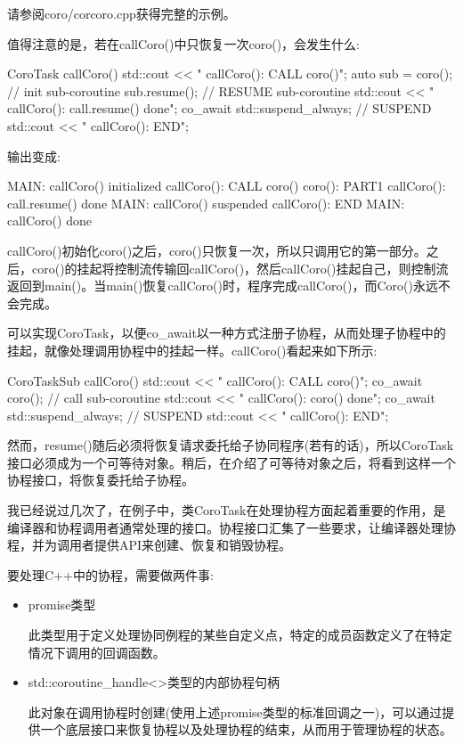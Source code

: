 请参阅coro/corcoro.cpp获得完整的示例。


值得注意的是，若在callCoro()中只恢复一次coro()，会发生什么:

\begin{cpp}
CoroTask callCoro()
{
	std::cout << " callCoro(): CALL coro()\n";
	auto sub = coro(); // init sub-coroutine
	sub.resume(); // RESUME sub-coroutine
	std::cout << " callCoro(): call.resume() done\n";
	co_await std::suspend_always{}; // SUSPEND
	std::cout << " callCoro(): END\n";
}
\end{cpp}

输出变成:

\begin{shell}
MAIN: callCoro() initialized
  callCoro(): CALL coro()
    coro(): PART1
  callCoro(): call.resume() done
MAIN: callCoro() suspended
  callCoro(): END
MAIN: callCoro() done
\end{shell}

callCoro()初始化coro()之后，coro()只恢复一次，所以只调用它的第一部分。之后，coro()的挂起将控制流传输回callCoro()，然后callCoro()挂起自己，则控制流返回到main()。当main()恢复callCoro()时，程序完成callCoro()，而Coro()永远不会完成。


可以实现CoroTask，以便co\_await以一种方式注册子协程，从而处理子协程中的挂起，就像处理调用协程中的挂起一样。callCoro()看起来如下所示:

\begin{cpp}
CoroTaskSub callCoro()
{
	std::cout << " callCoro(): CALL coro()\n";
	co_await coro(); // call sub-coroutine
	std::cout << " callCoro(): coro() done\n";
	co_await std::suspend_always{}; // SUSPEND
	std::cout << " callCoro(): END\n";
}
\end{cpp}

然而，resume()随后必须将恢复请求委托给子协同程序(若有的话)，所以CoroTask接口必须成为一个可等待对象。稍后，在介绍了可等待对象之后，将看到这样一个协程接口，将恢复委托给子协程。


我已经说过几次了，在例子中，类CoroTask在处理协程方面起着重要的作用，是编译器和协程调用者通常处理的接口。协程接口汇集了一些要求，让编译器处理协程，并为调用者提供API来创建、恢复和销毁协程。

要处理C++中的协程，需要做两件事:

\begin{itemize}
\item
promise类型

此类型用于定义处理协同例程的某些自定义点，特定的成员函数定义了在特定情况下调用的回调函数。

\item
std::coroutine\_handle<>类型的内部协程句柄

此对象在调用协程时创建(使用上述promise类型的标准回调之一)，可以通过提供一个底层接口来恢复协程以及处理协程的结束，从而用于管理协程的状态。
\end{itemize}

